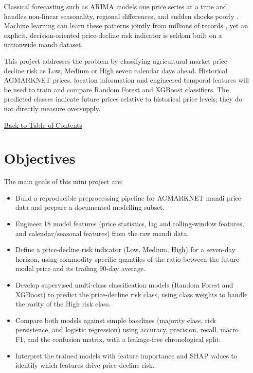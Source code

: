 \documentclass[12pt,a4paper]{article}
\begin{document}
Classical forecasting such as ARIMA models one price series at a time and handles non-linear seasonality, regional differences, and sudden shocks poorly \cite{box2008time}. Machine learning can learn these patterns jointly from millions of records \cite{makridakis2018statistical}, yet an explicit, decision-oriented price-decline risk indicator is seldom built on a nationwide mandi dataset.

This project addresses the problem by classifying agricultural market price-decline risk as Low, Medium or High seven calendar days ahead. Historical AGMARKNET prices, location information and engineered temporal features will be used to train and compare Random Forest and XGBoost classifiers. The predicted classes indicate future prices relative to historical price levels; they do not directly measure oversupply.

\hyperref[contents]{\small Back to Table of Contents}
\newpage
\section{Objectives }
The main goals of this mini project are:
\begin{itemize}
    \item Build a reproducible preprocessing pipeline for AGMARKNET mandi price data and prepare a documented modelling subset.
    \item Engineer 18 model features (price statistics, lag and rolling-window features, and calendar/seasonal features) from the raw mandi data.
    \item Define a price-decline risk indicator (Low, Medium, High) for a seven-day horizon, using commodity-specific quantiles of the ratio between the future modal price and its trailing 90-day average.
    \item Develop supervised multi-class classification models (Random Forest and XGBoost) to predict the price-decline risk class, using class weights to handle the rarity of the High risk class.
    \item Compare both models against simple baselines (majority class, risk persistence, and logistic regression) using accuracy, precision, recall, macro F1, and the confusion matrix, with a leakage-free chronological split.
    \item Interpret the trained models with feature importance and SHAP values to identify which features drive price-decline risk.
\end{itemize}
\end{document}
